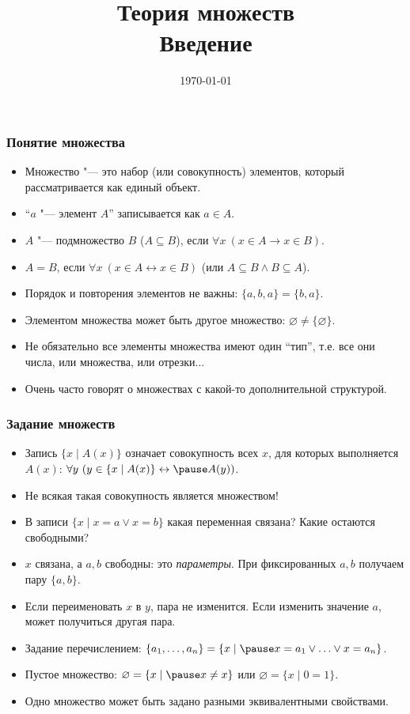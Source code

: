 \documentclass[10pt]{beamer}
\title{Теория множеств\\Введение}
\date{\today}
\begin{document}
\begin{frame}[plain]
\maketitle
\end{frame}

\begin{frame}
    \frametitle{Понятие множества}
    \begin{itemize}
        \item Множество "--- это набор (или совокупность) элементов, который рассматривается как единый объект.
        \item \enquote{$a$ "--- элемент $A$} записывается как $a \in A$.
        \item $A$ "--- подмножество $B$ ($A \subseteq B$), если \pause $\forall x ~ (x \in A \to x \in B)$.
        \item $A = B$, если \pause $\forall x ~ (x \in A \leftrightarrow x \in B)$ (или $A \subseteq B \land B \subseteq A$).
        \item Порядок и повторения элементов не важны: $\{a,b,a\}=\{b,a\}$.
        \item Элементом множества может быть другое множество: $\varnothing\neq\{\varnothing\}$.
        \item Не обязательно все элементы множества имеют один \enquote{тип}, т.е. все они числа, или множества, или отрезки$\ldots$
        \item Очень часто говорят о множествах с какой-то дополнительной структурой.
    \end{itemize}
\end{frame}

\begin{frame}
    \frametitle{Задание множеств}
    \begin{itemize}
        \item Запись $\{x \mid A(x)\}$ означает совокупность всех $x$, для которых выполняется $A(x)$:
        $\forall y ~ (y \in \{x \mid A(x)\} \leftrightarrow \pause A(y))$.
        \item Не всякая такая совокупность является множеством!
        \item В записи $\{x\mid x=a\lor x=b\}$ какая переменная связана? Какие остаются свободными?
        \pause
        \item $x$ связана, а $a,b$ свободны: это \emph{параметры}. При фиксированных $a,b$ получаем пару $\{a,b\}$.
        \item Если переименовать $x$ в $y$, пара не изменится. Если изменить значение $a$, может получиться другая пара.
        \item Задание перечислением: $\{a_1,\ldots,a_n\} = \{x \mid \pause x = a_1 \lor \ldots \lor x = a_n \}$.
        \item Пустое множество: $\varnothing = \{x \mid \pause x \neq x\}$ или $\varnothing = \{x \mid 0=1\}$.
        \item Одно множество может быть задано разными эквивалентными свойствами.
    \end{itemize}
\end{frame}
\end{document}
